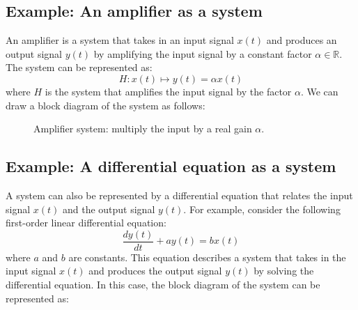 \subsection{Example: An amplifier as a system}
An amplifier is a system that takes in an input signal $x(t)$ and produces an output signal $y(t)$ by amplifying the input signal by a constant factor $\alpha \in \mathbb{R}$. The system can be represented as:
\[
    H: x(t) \mapsto y(t) = \alpha x(t)
\]
where $H$ is the system that amplifies the input signal by the factor $\alpha$. We can draw a block diagram of the system as follows:
\begin{figure}[h]
\centering
{}
\caption{Amplifier system: multiply the input by a real gain \(\alpha\).}
\end{figure}
\subsection{Example: A differential equation as a system}
A system can also be represented by a differential equation that relates the input signal $x(t)$ and the output signal $y(t)$. For example, consider the following first-order linear differential equation:
\[
    \frac{dy(t)}{dt} + ay(t) = bx(t)
\]
where $a$ and $b$ are constants. This equation describes a system that takes in the input signal $x(t)$ and produces the output signal $y(t)$ by solving the differential equation.
In this case, the block diagram of the system can be represented as:
\usetikzlibrary{arrows.meta,positioning,calc}

